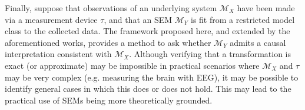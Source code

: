 Finally, suppose that observations of an underlying system $\mathcal{M}_X$ have been made via a measurement device $\tau$, and that an SEM $\mathcal{M}_Y$ is fit from a restricted model class to the collected data.
The framework proposed here, and extended by the aforementioned works, provides a method to ask whether $\mathcal{M}_Y$ admits a causal interpretation consistent with $\mathcal{M}_X$.
Although verifying that a transformation is exact (or approximate) may be impossible in practical scenarios where $\mathcal{M}_X$ and $\tau$ may be very complex (e.g. measuring the brain with EEG), it may be possible to identify general cases in which this does or does not hold.
This may lead to the practical use of SEMs being more theoretically grounded.








